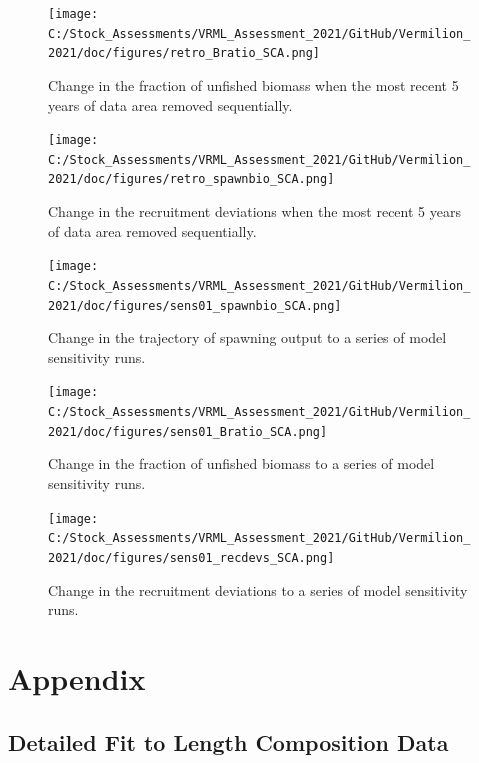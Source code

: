 \documentclass[
  english,
  a4paper,
]{article}
\begin{document}
\begin{figure}
\centering
\texttt{[image: C:/Stock\_Assessments/VRML\_Assessment\_2021/GitHub/Vermilion\_2021/doc/figures/retro\_Bratio\_SCA.png]}
\caption{Change in the fraction of unfished biomass when the most recent 5 years of data area removed sequentially.\label{fig:retro-bratio}}
\end{figure}

\begin{figure}
\centering
\texttt{[image: C:/Stock\_Assessments/VRML\_Assessment\_2021/GitHub/Vermilion\_2021/doc/figures/retro\_spawnbio\_SCA.png]}
\caption{Change in the recruitment deviations when the most recent 5 years of data area removed sequentially.\label{fig:retro-recdev}}
\end{figure}

\begin{figure}
\centering
\texttt{[image: C:/Stock\_Assessments/VRML\_Assessment\_2021/GitHub/Vermilion\_2021/doc/figures/sens01\_spawnbio\_SCA.png]}
\caption{Change in the trajectory of spawning output to a series of model sensitivity runs.\label{fig:sens1-spawnb}}
\end{figure}

\begin{figure}
\centering
\texttt{[image: C:/Stock\_Assessments/VRML\_Assessment\_2021/GitHub/Vermilion\_2021/doc/figures/sens01\_Bratio\_SCA.png]}
\caption{Change in the fraction of unfished biomass to a series of model sensitivity runs.\label{fig:sens1-bratio}}
\end{figure}

\begin{figure}
\centering
\texttt{[image: C:/Stock\_Assessments/VRML\_Assessment\_2021/GitHub/Vermilion\_2021/doc/figures/sens01\_recdevs\_SCA.png]}
\caption{Change in the recruitment deviations to a series of model sensitivity runs.\label{fig:sens1-recdev}}
\end{figure}

\clearpage

\hypertarget{appendix}{%
\section{Appendix}\label{appendix}}

\hypertarget{append-fit}{%
\subsection{Detailed Fit to Length Composition Data}\label{append-fit}}
\end{document}
